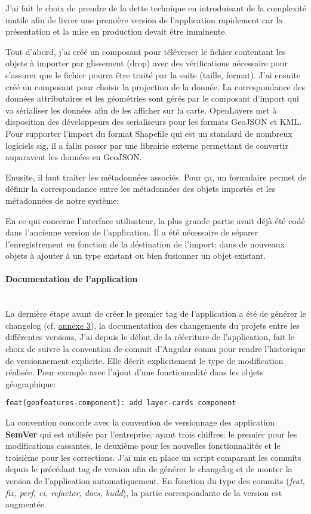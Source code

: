 \documentclass{rapportUHA40}
\begin{document}
J'ai fait le choix de prendre de la dette technique en introduisant de la
complexité inutile afin de livrer une première version de l'application
rapidement car la présentation et la mise en production devait être imminente.

Tout d'abord, j'ai créé un composant pour téléverser le fichier contentant les
objets à importer par glissement (drop) avec des vérifications nécessaire pour
s'assurer que le fichier pourra être traité par la suite (taille, format). J'ai
ensuite créé un composant pour choisir la projection de la donnée. La
correspondance des données attributaires et les géométries sont gérés par le
composant d'import qui va sérialiser les données afin de les afficher sur la
carte. OpenLayers met à disposition des développeurs des serialiseurs pour les
formats GeoJSON et KML\@. Pour supporter l'import du format Shapefile qui est
un standard de nombreux logiciels \gls{sig}, il a fallu passer par une
librairie externe permettant de convertir auparavent les données en GeoJSON\@.

Enusite, il faut traiter les métadonnées associés. Pour ça, un formulaire
permet de définir la correspondance entre les métadonnées des objets importés
et les métadonnées de notre système:

En ce qui concerne l'interface utilisateur, la plus grande partie avait déjà
été codé dans l'ancienne version de l'application. Il a été nécessaire de
séparer l'enregistrement en fonction de la déstination de l'import: dans de
nouveaux objets à ajouter à un type existant ou bien fusionner un objet
existant. \\

\paragraph{Documentation de l'application}\mbox{}\\
La dernière étape avant de créer le premier tag de l'application a été de
générer le changelog (cf. \hyperlink{ANNEX3}{annexe 3}), la documentation des
changements du projets entre les différentes versions. J'ai depuis le début de
la réécriture de l'application, fait le choix de suivre la convention de commit
d'Angular connu pour rendre l'historique de versionnement explicite. Elle
décrit explicitement le type de modification réalisée. Pour exemple avec
l'ajout d'une fonctionnalité dans les objets géographique:
\begin{verbatim}
feat(geofeatures-component): add layer-cards component
\end{verbatim}
La convention concorde avec la convention de versionnage des application
\textbf{SemVer} qui est utilisée par l'entreprise, ayant trois chiffres: le
premier pour les modifications cassantes, le deuxième pour les nouvelles
fonctionnalités et le troisième pour les corrections. J'ai mis en place un
script comparant les commits depuis le précédant tag de version afin de générer
le changelog et de monter la version de l'application automatiquement. En
fonction du type des commits (\textit{feat, fix, perf, ci, refactor, docs,
  build}), la partie correspondante de la version est augmentée.
\end{document}
